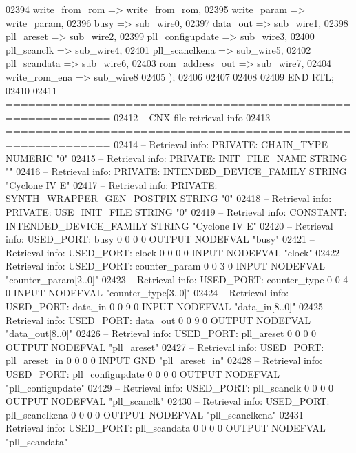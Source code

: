 \begin{DoxyCode}
{02394         write_from_rom => write_from_rom,
02395         write_param => write_param,
02396         busy => sub_wire0,
02397         data_out => sub_wire1,
02398         pll_areset => sub_wire2,
02399         pll_configupdate => sub_wire3,
02400         pll_scanclk => sub_wire4,
02401         pll_scanclkena => sub_wire5,
02402         pll_scandata => sub_wire6,
02403         rom_address_out => sub_wire7,
02404         write_rom_ena => sub_wire8
02405     \textcolor{vhdlchar}{)};
02406 
02407 
02408 
02409 \textcolor{keywordflow}{END} \textcolor{vhdlchar}{RTL};
02410 
02411 \textcolor{keyword}{-- ============================================================}
02412 \textcolor{keyword}{-- CNX file retrieval info}
02413 \textcolor{keyword}{-- ============================================================}
02414 \textcolor{keyword}{-- Retrieval info: PRIVATE: CHAIN\_TYPE NUMERIC "0"}
02415 \textcolor{keyword}{-- Retrieval info: PRIVATE: INIT\_FILE\_NAME STRING ""}
02416 \textcolor{keyword}{-- Retrieval info: PRIVATE: INTENDED\_DEVICE\_FAMILY STRING "Cyclone IV E"}
02417 \textcolor{keyword}{-- Retrieval info: PRIVATE: SYNTH\_WRAPPER\_GEN\_POSTFIX STRING "0"}
02418 \textcolor{keyword}{-- Retrieval info: PRIVATE: USE\_INIT\_FILE STRING "0"}
02419 \textcolor{keyword}{-- Retrieval info: CONSTANT: INTENDED\_DEVICE\_FAMILY STRING "Cyclone IV E"}
02420 \textcolor{keyword}{-- Retrieval info: USED\_PORT: busy 0 0 0 0 OUTPUT NODEFVAL "busy"}
02421 \textcolor{keyword}{-- Retrieval info: USED\_PORT: clock 0 0 0 0 INPUT NODEFVAL "clock"}
02422 \textcolor{keyword}{-- Retrieval info: USED\_PORT: counter\_param 0 0 3 0 INPUT NODEFVAL "counter\_param[2..0]"}
02423 \textcolor{keyword}{-- Retrieval info: USED\_PORT: counter\_type 0 0 4 0 INPUT NODEFVAL "counter\_type[3..0]"}
02424 \textcolor{keyword}{-- Retrieval info: USED\_PORT: data\_in 0 0 9 0 INPUT NODEFVAL "data\_in[8..0]"}
02425 \textcolor{keyword}{-- Retrieval info: USED\_PORT: data\_out 0 0 9 0 OUTPUT NODEFVAL "data\_out[8..0]"}
02426 \textcolor{keyword}{-- Retrieval info: USED\_PORT: pll\_areset 0 0 0 0 OUTPUT NODEFVAL "pll\_areset"}
02427 \textcolor{keyword}{-- Retrieval info: USED\_PORT: pll\_areset\_in 0 0 0 0 INPUT GND "pll\_areset\_in"}
02428 \textcolor{keyword}{-- Retrieval info: USED\_PORT: pll\_configupdate 0 0 0 0 OUTPUT NODEFVAL "pll\_configupdate"}
02429 \textcolor{keyword}{-- Retrieval info: USED\_PORT: pll\_scanclk 0 0 0 0 OUTPUT NODEFVAL "pll\_scanclk"}
02430 \textcolor{keyword}{-- Retrieval info: USED\_PORT: pll\_scanclkena 0 0 0 0 OUTPUT NODEFVAL "pll\_scanclkena"}
02431 \textcolor{keyword}{-- Retrieval info: USED\_PORT: pll\_scandata 0 0 0 0 OUTPUT NODEFVAL "pll\_scandata"}
}
\end{DoxyCode}
